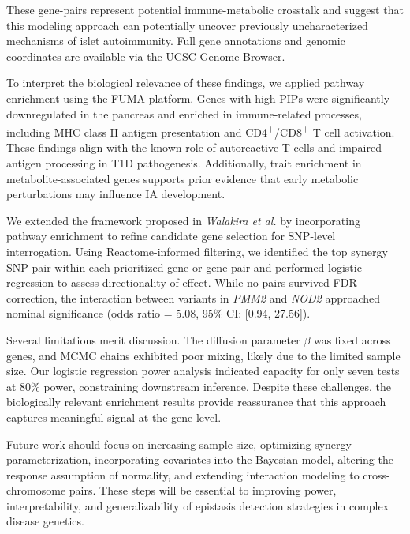 \documentclass{article}\usepackage[]{graphicx}\usepackage[]{color}
\begin{document}
These gene-pairs represent potential immune-metabolic crosstalk and suggest that this modeling approach can potentially uncover previously uncharacterized mechanisms of islet autoimmunity. Full gene annotations and genomic coordinates are available via the UCSC Genome Browser\cite{perezUCSCGenomeBrowser2025}.
\par
To interpret the biological relevance of these findings, we applied pathway enrichment using the FUMA\cite{watanabeFunctionalMappingAnnotation2017} platform. Genes with high PIPs were significantly downregulated in the pancreas and enriched in immune-related processes, including MHC class II antigen presentation and CD4\textsuperscript{+}/CD8\textsuperscript{+} T cell activation. These findings align with the known role of autoreactive T cells and impaired antigen processing in T1D pathogenesis. Additionally, trait enrichment in metabolite-associated genes supports prior evidence that early metabolic perturbations may influence IA development\cite{lamichhaneCirculatingMetabolicSignatures2023,maMetabolomicsAnalysisSerum2024}.
\par
We extended the framework proposed in \textit{Walakira et al.} \cite{walakiraDetectingGeneGene2022} by incorporating pathway enrichment to refine candidate gene selection for SNP-level interrogation. Using Reactome-informed filtering, we identified the top synergy SNP pair within each prioritized gene or gene-pair and performed logistic regression to assess directionality of effect. While no pairs survived FDR correction, the interaction between variants in \textit{PMM2} and \textit{NOD2} approached nominal significance (odds ratio = 5.08, 95\% CI: [0.94, 27.56]).
\par
Several limitations merit discussion. The diffusion parameter $\beta$ was fixed across genes, and MCMC chains exhibited poor mixing, likely due to the limited sample size. Our logistic regression power analysis indicated capacity for only seven tests at 80\% power, constraining downstream inference. Despite these challenges, the biologically relevant enrichment results provide reassurance that this approach captures meaningful signal at the gene-level.
\par
Future work should focus on increasing sample size, optimizing synergy parameterization, incorporating covariates into the Bayesian model, altering the response assumption of normality, and extending interaction modeling to cross-chromosome pairs. These steps will be essential to improving power, interpretability, and generalizability of epistasis detection strategies in complex disease genetics.
\end{document}
